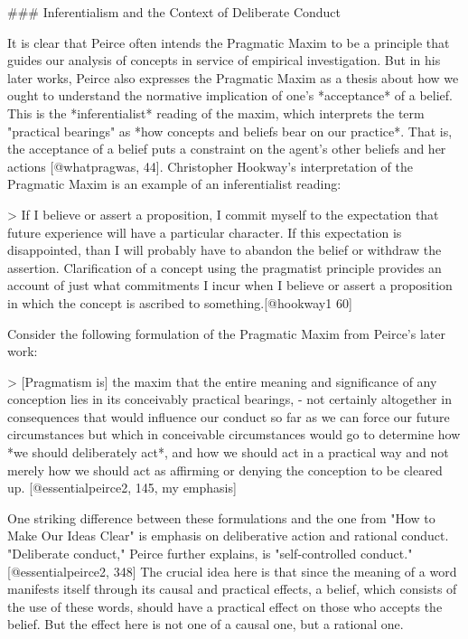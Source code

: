 \#\#\# Inferentialism and the Context of Deliberate Conduct

It is clear that Peirce often intends the Pragmatic Maxim to be a
principle that guides our analysis of concepts in service of empirical
investigation. But in his later works, Peirce also expresses the
Pragmatic Maxim as a thesis about how we ought to understand the
normative implication of one's *acceptance* of a belief. This is the
*inferentialist* reading of the maxim, which interprets the term
"practical bearings" as *how concepts and beliefs bear on our practice*.
That is, the acceptance of a belief puts a constraint on the agent's
other beliefs and her actions {[}@whatpragwas, 44{]}. Christopher
Hookway's interpretation of the Pragmatic Maxim is an example of an
inferentialist reading:

\textgreater{} If I believe or assert a proposition, I commit myself to
the expectation that future experience will have a particular character.
If this expectation is disappointed, than I will probably have to
abandon the belief or withdraw the assertion. Clarification of a concept
using the pragmatist principle provides an account of just what
commitments I incur when I believe or assert a proposition in which the
concept is ascribed to something.{[}@hookway1 60{]}

Consider the following formulation of the Pragmatic Maxim from Peirce's
later work:

\textgreater{} {[}Pragmatism is{]} the maxim that the entire meaning and
significance of any conception lies in its conceivably practical
bearings, - not certainly altogether in consequences that would
influence our conduct so far as we can force our future circumstances
but which in conceivable circumstances would go to determine how *we
should deliberately act*, and how we should act in a practical way and
not merely how we should act as affirming or denying the conception to
be cleared up. {[}@essentialpeirce2, 145, my emphasis{]}

One striking difference between these formulations and the one from "How
to Make Our Ideas Clear" is emphasis on deliberative action and rational
conduct. "Deliberate conduct," Peirce further explains, is
"self-controlled conduct." {[}@essentialpeirce2, 348{]} The crucial idea
here is that since the meaning of a word manifests itself through its
causal and practical effects, a belief, which consists of the use of
these words, should have a practical effect on those who accepts the
belief. But the effect here is not one of a causal one, but a rational
one.

